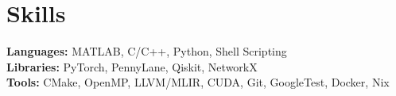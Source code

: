 \documentclass[11pt,a4paper,sans]{moderncv}
\newcommand{\sectiongap}[0]{\vspace{-0.5cm}}
\begin{document}
\sectiongap

\section{Skills}

\textbf{Languages:} MATLAB, C/C++, Python, Shell Scripting\\
\textbf{Libraries:} PyTorch, PennyLane, Qiskit, NetworkX\\
\textbf{Tools:} CMake, OpenMP, LLVM/MLIR, CUDA, Git, GoogleTest, Docker, Nix
\end{document}

